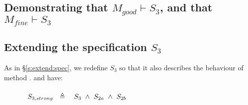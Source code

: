 \newcommand{\SThree}{S_3}
\newcommand{\SThreeStrong}{S_{3,strong}}

\subsection{Demonstrating that $M_{good} \vdash \SThree$, and that $M_{fine} \vdash \SThree$}
 \label{s:app:example:proofs}


 \subsection{Extending the specification $\SThree$}
\label{s:extend:spec:three}

As in \S \ref{s:extend:spec}, we redefine $\SThree$ so that it also describes the behaviour of method . and have:
\\
\\
$\strut  \SPSP  \SThreeStrong \ \  \triangleq \ \ \ \SThree \ \wedge \ S_{2a} \ \wedge \ S_{2b} $



  

